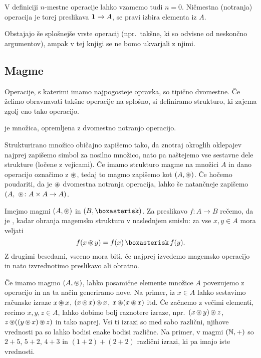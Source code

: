 V definiciji $n$-mestne operacije lahko vzamemo tudi $n = 0$. Ničmestna (notranja) operacija je torej preslikava $\mathtt{\mathbf{1}} \to A$, se pravi izbira elementa iz $A$.

Obstajajo še splošnejše vrste operacij (npr.~takšne, ki so odvisne od neskončno argumentov), ampak v tej knjigi se ne bomo ukvarjali z njimi.


\subsection{Magme}

Operacije, s katerimi imamo najpogosteje opravka, so tipično dvomestne. Če želimo obravnavati takšne operacije na splošno, si definiramo strukturo, ki zajema zgolj eno tako operacijo.

\begin{definicija}
	 je množica, opremljena z dvomestno notranjo operacijo.
\end{definicija}

Strukturirano množico običajno zapišemo tako, da znotraj okroglih oklepajev najprej zapišemo simbol za nosilno množico, nato pa naštejemo vse sestavne dele strukture (ločene z vejicami). Če imamo strukturo magme na množici $A$ in dano operacijo označimo z $\mathop{\circledast}\nolimits$, tedaj to magmo zapišemo kot $(A, \mathop{\circledast}\nolimits)$. Če hočemo poudariti, da je $\mathop{\circledast}\nolimits$ dvomestna notranja operacija, lahko še natančneje zapišemo $(A,\ \mathop{\circledast}\nolimits\colon A \times A \to A)$.

Imejmo magmi $(A, \mathop{\circledast}\nolimits)$ in $(B, \soper)$. Za preslikavo $f\colon A \to B$ rečemo, da je , kadar ohranja magemsko strukturo v naslednjem smislu: za vse $x, y \in A$ mora veljati
\[f(x \oper y) = f(x) \soper f(y).\]
Z drugimi besedami, vseeno mora biti, če najprej izvedemo magemsko operacijo in nato izvrednotimo preslikavo ali obratno.

Če imamo magmo $(A, \mathop{\circledast}\nolimits)$, lahko posamične elemente množice $A$ povezujemo z operacijo in na ta način generiramo nove. Na primer, iz $x \in A$ lahko sestavimo računske izraze $x \mathop{\circledast}\nolimits x$, $(x \mathop{\circledast}\nolimits x) \mathop{\circledast}\nolimits x$, $x \mathop{\circledast}\nolimits (x \mathop{\circledast}\nolimits x)$ itd. Če začnemo z večimi elementi, recimo $x, y, z \in A$, lahko dobimo bolj raznotere izraze, npr.~$(x \mathop{\circledast}\nolimits y) \mathop{\circledast}\nolimits z$, $z \mathop{\circledast}\nolimits ((y \mathop{\circledast}\nolimits x) \mathop{\circledast}\nolimits z)$ in tako naprej. Vsi ti izrazi so med sabo različni, njihove vrednosti pa so lahko bodisi enake bodisi različne. Na primer, v magmi $(\mathbb{N}, +)$ so $2 + 5$, $5 + 2$, $4 + 3$ in $(1 + 2) + (2 + 2)$ različni izrazi, ki pa imajo iste vrednosti.

